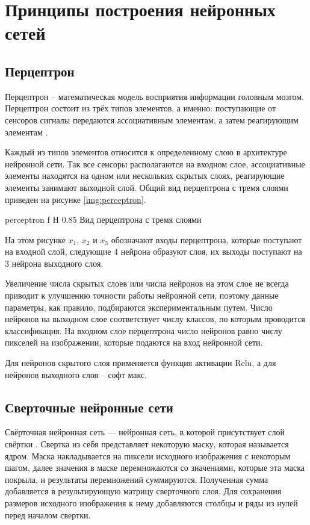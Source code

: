 \section{Принципы построения нейронных сетей}

\subsection{Перцептрон}
Перцептрон – математическая модель восприятия информации головным мозгом. Перцептрон состоит из трёх типов элементов, а именно: поступающие от сенсоров сигналы передаются ассоциативным элементам, а затем реагирующим элементам \cite{perceptron}.

Каждый из типов элементов относится к определенному слою в архитектуре нейронной сети. Так все сенсоры располагаются на входном слое, ассоциативные элементы находятся на одном или нескольких скрытых слоях, реагирующие элементы занимают выходной слой. Общий вид перцептрона с тремя слоями приведен на рисунке \ref{img:perceptron}.

{perceptron} %
{f} %
{H} %
{0.85\textwidth} %
{Вид перцептрона с тремя слоями} %

На этом рисунке $x_1$, $x_2$ и $x_3$ обозначают входы перцептрона, которые поступают на входной слой, следующие 4 нейрона образуют слоя, их выходы поступают на 3 нейрона выходного слоя.

Увеличение числа скрытых слоев или числа нейронов на этом слое не всегда приводит к улучшению точности работы нейронной сети, поэтому данные параметры, как правило, подбираются экспериментальным путем. Число нейронов на выходном слое соответствует числу классов, по которым проводится классификация. На входном слое перцептрона число нейронов равно числу пикселей на изображении, которые подаются на вход нейронной сети.

Для нейронов скрытого слоя применяется функция активации Relu, а для нейронов выходного слоя -- софт макс.

\subsection{Сверточные нейронные сети}
Свёрточная нейронная сеть — нейронная сеть, в которой присутствует слой свёртки \cite{svertka}. Свертка из себя представляет некоторую маску, которая называется ядром. Маска накладывается на пиксели исходного изображения с некоторым шагом, далее значения в маске перемножаются со значениями, которые эта маска покрыла, и результаты перемножений суммируются. Полученная сумма добавляется в результирующую матрицу сверточного слоя. Для сохранения размеров исходного изображения к нему добавляются столбцы и ряды из нулей перед началом свертки.

